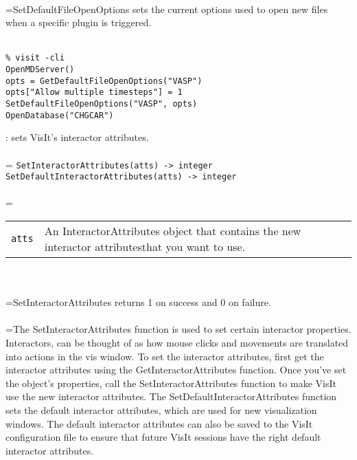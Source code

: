 \documentclass[10pt,a4paper]{report}
\begin{document}
 \\ 
\hangindent=\parindent SetDefaultFileOpenOptions sets the current options used to open new files when a specific plugin is triggered. \\[-3mm] 

\\[-6mm]
\begin{verbatim}% visit -cli
OpenMDServer()
opts = GetDefaultFileOpenOptions("VASP")
opts["Allow multiple timesteps"] = 1
SetDefaultFileOpenOptions("VASP", opts)
OpenDatabase("CHGCAR")
\end{verbatim}
\newpage


{}
: sets VisIt's interactor attributes.\\[-3mm]

 \\ 
\hangindent=\parindent 
\verb!SetInteractorAttributes(atts) -> integer!\\ 
\verb!SetDefaultInteractorAttributes(atts) -> integer!\\ [-3mm]

 \\ 
\hangindent=\parindent 
\begin{tabular}{lp{9cm}}
\verb!atts! & An InteractorAttributes object that contains the new interactor attributesthat you want to use. \\
\end{tabular} \\[-2mm]


 \\ 
\hangindent=\parindent SetInteractorAttributes returns 1 on success and 0 on failure. \\[-3mm] 

 \\ 
\hangindent=\parindent The SetInteractorAttributes function is used to set certain interactor properties. Interactors, can be thought of as how mouse clicks and movements are translated into actions in the vis window. To set the interactor attributes, first get the interactor attributes using the GetInteractorAttributes function. Once you've set the object's properties, call the SetInteractorAttributes function to make VisIt use the new interactor attributes. The SetDefaultInteractorAttributes function sets the default interactor attributes, which are used for new visualization windows. The default interactor attributes can also be saved to the VisIt configuration file to ensure that future VisIt sessions have the right default interactor attributes. \\[-3mm] 
\end{document}
